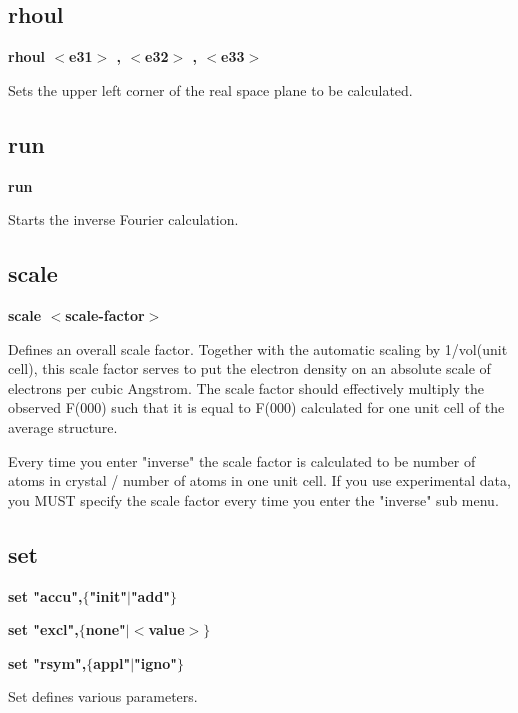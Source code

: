 \subsection*{rhoul}
{\bf rhoul $ <$e31$> $ , $ <$e32$> $ , $ <$e33$> $ \par }
\par
\vspace{3pt}
Sets the upper left corner of the real space plane to be calculated. 
\subsection*{run}
{\bf run \par }
\par
\vspace{3pt}
Starts the inverse Fourier calculation. 
\subsection*{scale}
{\bf scale $ <$scale-factor$> $ \par }
\par
\vspace{3pt}
Defines an overall scale factor. Together with the automatic scaling 
by 1/vol(unit cell), this scale factor serves to put the electron 
density on an absolute scale of electrons per cubic Angstrom. The 
scale factor should effectively multiply the observed F(000) such that 
it is equal to F(000) calculated for one unit cell of the average 
structure. 
\par
Every time you enter "inverse" the scale factor is calculated to be 
number of atoms in crystal / number of atoms in one unit cell. If you 
use experimental data, you MUST specify the scale factor every time you 
enter the "inverse" sub menu. 
\subsection*{set}
{\bf set "accu",$ \{$"init"$| $"add"$\} $ \par }
{\bf set "excl",$ \{$none"$| $$ <$value$> $$\} $ \par }
{\bf set "rsym",$ \{$appl"$| $"igno"$\} $ \par }
\par
\vspace{3pt}
Set defines various parameters. 
\par
